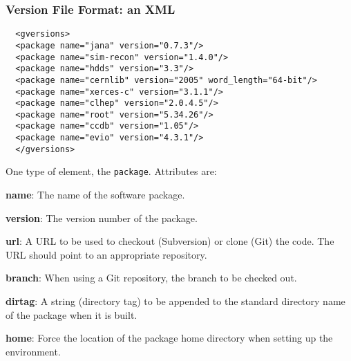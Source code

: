 \documentclass{beamer}
\begin{document}
\begin{frame}[fragile]
  \frametitle{Version File Format: an XML}

\begin{verbatim}
  <gversions>
  <package name="jana" version="0.7.3"/>
  <package name="sim-recon" version="1.4.0"/>
  <package name="hdds" version="3.3"/>
  <package name="cernlib" version="2005" word_length="64-bit"/>
  <package name="xerces-c" version="3.1.1"/>
  <package name="clhep" version="2.0.4.5"/>
  <package name="root" version="5.34.26"/>
  <package name="ccdb" version="1.05"/>
  <package name="evio" version="4.3.1"/>
  </gversions>
\end{verbatim}

One type of element, the {\tt package}. Attributes are:

\begin{description}
\item{\bf name}: The name of the software package.
\item{\bf version}: The version number of the package.
\item{\bf url}: A URL to be used to checkout (Subversion) or clone
  (Git) the code. The URL should point to an appropriate repository.
\item{\bf branch}: When using a Git repository, the branch to be
  checked out.
\item{\bf dirtag}: A string (directory tag) to be appended to the
  standard directory name of the package when it is built.
\item{\bf home}: Force the location of the package home directory when setting up the environment.
\end{description}

\end{frame}
\end{document}
